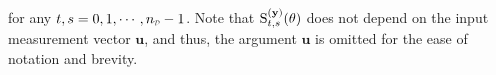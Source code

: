 for any $t,s = 0,1,\cdots, \nsmD-1$.
Note that ${ \mathrm{S} }_{t,s}^{(\mathbf{y})}({{ \mathrm{\theta} }})$  does not depend on the input measurement vector $\mathbf{u}$, and thus, the argument $\mathbf{u}$ is omitted for the ease of notation and brevity.
